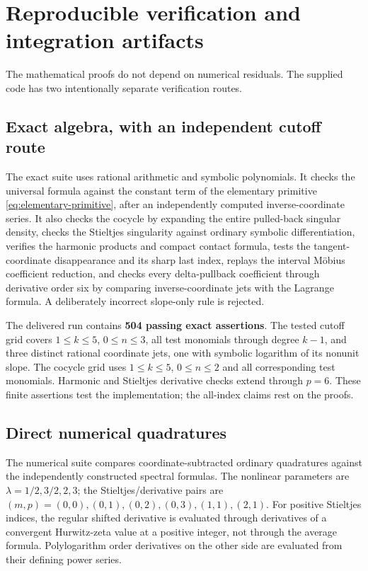 \documentclass[11pt]{article}
\theoremstyle{definition}\newtheorem{definition}[theorem]{Definition}
\theoremstyle{remark}\newtheorem{remark}[theorem]{Remark}
\begin{document}
\section{Reproducible verification and integration artifacts}
\label{sec:verification}
The mathematical proofs do not depend on numerical residuals. The supplied code has two intentionally separate verification routes.

\subsection{Exact algebra, with an independent cutoff route}
The exact suite uses rational arithmetic and symbolic polynomials. It checks the universal formula against the constant term of the elementary primitive \eqref{eq:elementary-primitive}, after an independently computed inverse-coordinate series. It also checks the cocycle by expanding the entire pulled-back singular density, checks the Stieltjes singularity against ordinary symbolic differentiation, verifies the harmonic products and compact contact formula, tests the tangent-coordinate disappearance and its sharp last index, replays the interval M\"obius coefficient reduction, and checks every delta-pullback coefficient through derivative order six by comparing inverse-coordinate jets with the Lagrange formula. A deliberately incorrect slope-only rule is rejected.

The delivered run contains \textbf{504 passing exact assertions}. The tested cutoff grid covers $1\le k\le5$, $0\le n\le3$, all test monomials through degree $k-1$, and three distinct rational coordinate jets, one with symbolic logarithm of its nonunit slope. The cocycle grid uses $1\le k\le5$, $0\le n\le2$ and all corresponding test monomials. Harmonic and Stieltjes derivative checks extend through $p=6$. These finite assertions test the implementation; the all-index claims rest on the proofs.

\subsection{Direct numerical quadratures}
The numerical suite compares coordinate-subtracted ordinary quadratures against the independently constructed spectral formulas. The nonlinear parameters are $\lambda=1/2,3/2,2,3$; the Stieltjes/derivative pairs are
$(m,p)=(0,0),(0,1),(0,2),(0,3),(1,1),(2,1)$.
For positive Stieltjes indices, the regular shifted derivative is evaluated through derivatives of a convergent Hurwitz-zeta value at a positive integer, not through the average formula. Polylogarithm order derivatives on the other side are evaluated from their defining power series.
\end{document}
